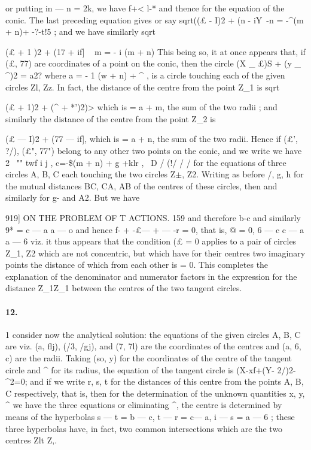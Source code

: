 \documentclass[11pt,a4paper]{book}
\begin{document}
{{or  putting  in  ---  n  =  2k,  we  have
f+< l-*
and  thence
for  the  equation  of  the  conic.     The  last  preceding  equation  gives
or  say
sqrt((£  -  I)2  +  (n  -  iY\  -n  =  -^(m  +  n)+  -?-t!5  ;
and  we  have  similarly
sqrt{
(£  +  1  )2  +  (17  +  if]  ~  m  =  -  i  (m  +  n)
This   being   so,   it   at   once   appears   that,   if    (£,  77)    are    coordinates    of    a    point   on
the  conic,  then  the  circle
(X  \_  £)S  +  (y  \_  ^)2  =   a2?
where
a  =  -  1  (w  +  n)  +       ^  ,
is  a  circle  touching  each  of  the  given  circles  Zl,  Zz.  In  fact,  the  distance  of  the
centre  from  the  point  Z_1  is  sqrt{(£  +  1)2  +  (^  +  *')2)>  which  is  =  a  +  m,  the  sum  of  the  two
radii  ;  and  similarly  the  distance  of  the  centre  from  the  point  Z_2  is  \/{(£  ---  I)2  +  (77  ---  if],
which  is  =  a  +  n,  the  sum  of  the  two  radii.
Hence   if  (£',   ?/),   (£",   77")   belong   to   any   other   two   points   on    the   conic,   and    we
write
we  have
2  \ ""         twf    i  j  ,
c=-\$(m  +  n)  + g   +klr
,
\  D        /  (!/  /       /
for  the  equations  of  three  circles  A,  B,  C  each  touching  the  two  circles  Z$\pm$,  Z2.
Writing  as  before  /,  g,  h  for  the  mutual  distances  BC,  CA,  AB  of  the  centres  of  these
circles,  then
and  similarly  for  g-  and  A2.     But  we  have


919]  ON   THE    PROBLEM    OF   T ACTIONS.  159
and  therefore
b-c
and  similarly
9*    =
c  ---  a
a  ---  o
and  hence
f-  +  -£---  +  --- -r  =  0,  that  is,  @  =  0,
6  ---  c     c  ---  a     a  ---  6
viz.  it  thus  appears  that  the  condition  (£  =  0  applies  to  a  pair  of  circles  Z_1,  Z2
which  are  not  concentric,  but  which  have  for  their  centres  two  imaginary  points  the
distance  of  which  from  each  other  is  =  0.
This   completes   the   explanation   of  the   denominator   and   numerator   factors   in    the
expression  for  the  distance  Z_1Z_1  between  the  centres  of  the  two  tangent  circles.
\paragraph{12.} 1    consider    now   the    analytical    solution:    the    equations    of    the    given    circles
A,  B,  C  are
viz.  (a,  flj),  (/3,  /gj),  and  (7,  7l)  are  the  coordinates  of  the  centres  and  (a,  6,  c)  are
the  radii.  Taking  (so,  y)  for  the  coordinates  of  the  centre  of  the  tangent  circle  and
^  for  its  radius,  the  equation  of  the  tangent  circle  is
(X-xf+(Y-  2/)2-^2=0;
and  if  we  write  r,  s,  t  for  the  distances  of  this  centre  from  the  points  A,  B,  C
respectively,  that  is,
then    for    the    determination    of   the    unknown    quantities    x,    y,    ^    we    have    the    three
equations
or  eliminating  ^,  the  centre  is  determined  by  means  of  the  hyperbolas
s  ---  t  =  b  ---  c,     t  ---  r  =  c---  a,     i  ---  s  =  a  ---  6  ;
these  three  hyperbolas  have,  in  fact,  two  common  intersections  which  are  the  two  centres
Zlt  Z,.


}}}}}
\end{document}
